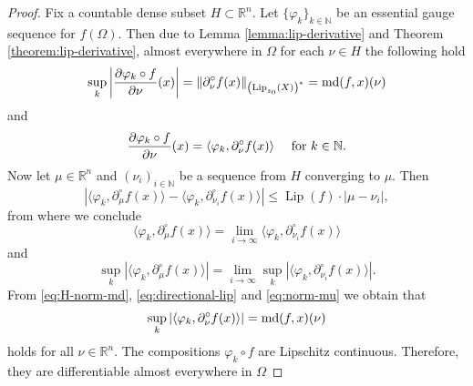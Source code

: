 \documentclass[reqno]{amsart}
\begin{document}
\begin{proof}
Fix a countable dense subset $H\subset\mathbb R^n$.
Let $\{\varphi_k\}_{k\in\mathbb N}$ be an essential gauge sequence for $f(\Omega)$.
Then due to Lemma \ref{lemma:lip-derivative} and Theorem \ref{theorem:lip-derivative},
almost everywhere in  $\Omega$ for each $\nu\in H$ the following hold
\begin{equation}\label{eq:H-norm-md}
\sup_{k} \bigg| \frac{\partial \varphi_{k}\circ f}{\partial\nu}(x)\bigg| = \|\partial^\circ_\nu f(x)\|_{\left(\textnormal{Lip}_{z_0}(X)\right)^*} =  \textnormal{md}(f, x)(\nu) 
\end{equation}
and
\begin{equation}\label{eq:directional-lip}
\frac{\partial \varphi_{k}\circ f}{\partial\nu}(x) =  \langle \varphi_k, \partial^\circ_\nu f(x) \rangle \quad \textnormal{ for } k\in\mathbb N.
\end{equation}
Now let $\mu\in\mathbb R^n$ and $(\nu_i)_{i\in\mathbb N}$ be a sequence from $H$ converging to $\mu$. 
Then 
\[
| \langle \varphi_k, \partial^\circ_\mu f(x) \rangle -  \langle \varphi_k, \partial^\circ_{\nu_i} f(x) \rangle | \leq \operatorname{Lip}(f)\cdot |\mu - \nu_i|,
\]
from where we conclude
\begin{equation}\label{eq:lip-derivative-mu}
 \langle \varphi_k, \partial^\circ_\mu f(x) \rangle = \lim_{i\to\infty}   \langle \varphi_k, \partial^\circ_{\nu_i} f(x) \rangle
\end{equation}
and 
\begin{equation}\label{eq:norm-mu}
\sup_k|  \langle \varphi_k, \partial^\circ_\mu f(x) \rangle| = \lim_{i\to\infty} \sup_k|  \langle \varphi_k, \partial^\circ_{\nu_i} f(x) \rangle|. 
\end{equation}
From \eqref{eq:H-norm-md}, \eqref{eq:directional-lip} and \eqref{eq:norm-mu} we obtain that 
\[
\sup_k|  \langle \varphi_k, \partial^\circ_\nu f(x) \rangle| =  \textnormal{md}(f, x)(\nu) 
\]
holds for all $\nu\in\mathbb R^n$.
The compositions $\varphi_{k}\circ f$ are Lipschitz continuous. 
Therefore, they are differentiable almost everywhere in $\Omega$

\end{proof}
\end{document}
